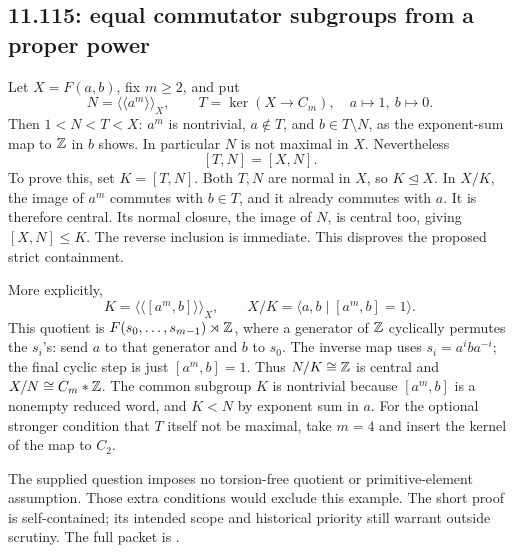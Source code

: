 \subsection{11.115: equal commutator subgroups from a proper power}
\label{cand:11.115}
Let \(X=F(a,b)\), fix \(m\ge2\), and put
\[
 N=\langle\!\langle a^m\rangle\!\rangle_X,\qquad
 T=\ker(X\longrightarrow C_m),\quad a\mapsto1,\ b\mapsto0.
\]
Then \(1<N<T<X\): \(a^m\) is nontrivial, \(a\notin T\), and
\(b\in T\setminus N\), as the exponent-sum map to \(\mathbb Z\) in \(b\)
shows. In particular \(N\) is not maximal in \(X\).
Nevertheless
\[
 [T,N]=[X,N].
\]
To prove this, set \(K=[T,N]\). Both \(T,N\) are normal in \(X\),
so \(K\trianglelefteq X\). In \(X/K\), the image of \(a^m\) commutes
with \(b\in T\), and it already commutes with \(a\).
It is therefore central. Its normal closure, the image of \(N\),
is central too, giving \([X,N]\le K\). The reverse inclusion is immediate.
This disproves the proposed strict containment.

More explicitly,
\[
 K=\langle\!\langle[a^m,b]\rangle\!\rangle_X,\qquad
 X/K=\langle a,b\mid[a^m,b]=1\rangle.
\]
This quotient is \(F(s_0,\ldots,s_{m-1})\rtimes\mathbb Z\), where a generator
of \(\mathbb Z\) cyclically permutes the \(s_i\)'s:
send \(a\) to that generator and \(b\) to \(s_0\).
The inverse map uses \(s_i=a^iba^{-i}\); the final cyclic step is
just \([a^m,b]=1\).
Thus \(N/K\cong\mathbb Z\) is central and \(X/N\cong C_m*\mathbb Z\).
The common subgroup \(K\) is nontrivial because \([a^m,b]\) is
a nonempty reduced word, and \(K<N\) by exponent sum in \(a\).
For the optional stronger condition that \(T\) itself not be maximal,
take \(m=4\) and insert the kernel of the map to \(C_2\).

The supplied question imposes no torsion-free quotient or
primitive-element assumption. Those extra conditions would exclude
this example. The short proof is self-contained; its intended scope
and historical priority still warrant outside scrutiny.
The full packet is .
